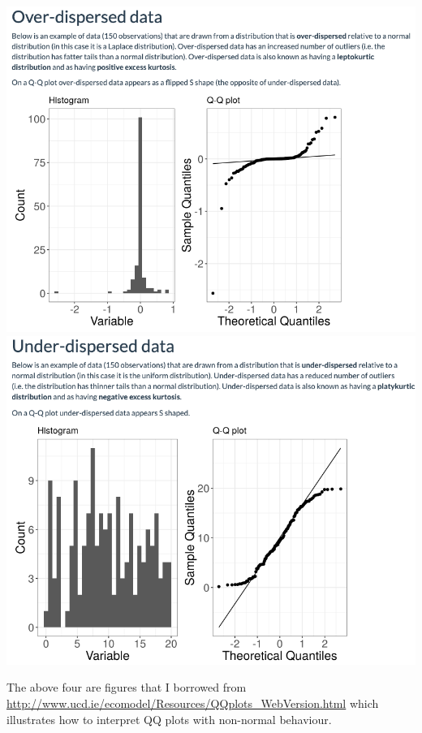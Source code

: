 \documentclass[10pt]{article}
\begin{document}
\begin{center}
    \includegraphics[scale=0.24]{img/qq_over.png}
    \includegraphics[scale=0.24]{img/qq_under.png}
\end{center}
The above four are figures that I borrowed from \url{http://www.ucd.ie/ecomodel/Resources/QQplots_WebVersion.html} which illustrates how to interpret QQ plots with non-normal behaviour.
\end{document}
